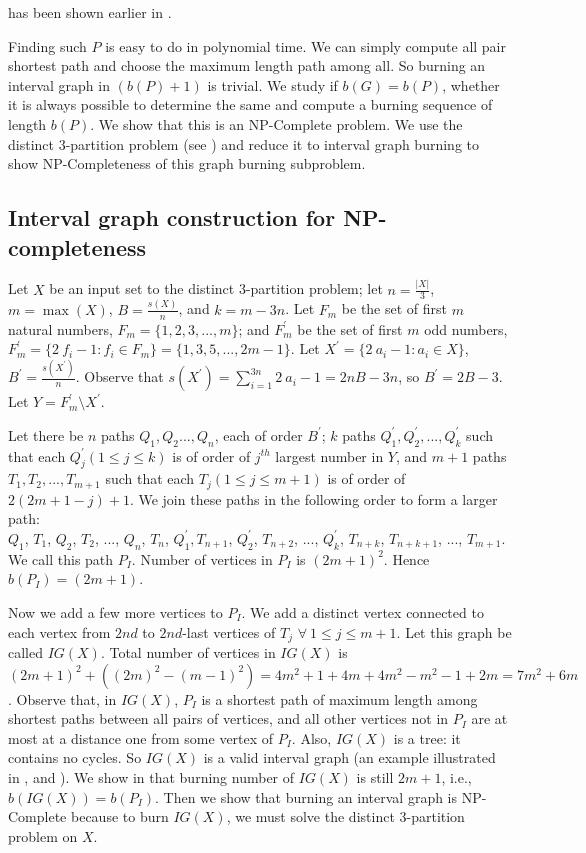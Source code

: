  has been shown earlier in \cite{Kare2019,Kamali2019,Kamali2020}.

Finding such $P$ is easy to do in polynomial time. We can simply compute all pair shortest path and choose the maximum length path among all. So burning an interval graph in $(b(P)+1)$ is trivial. We study if $b(G)=b(P)$, whether it is always possible to determine the same and compute a burning sequence of length $b(P)$. 
We show that this is an NP-Complete problem.
We use the distinct 3-partition problem (see ) and reduce it to interval graph burning to show NP-Completeness of this graph burning subproblem.

\subsection{Interval graph construction for NP-completeness}

Let $X$ be an input set to the distinct 3-partition problem; let $n=\frac{|X|}{3}$, $m = \max (X)$, $B = \frac{s(X)}{n}$, and $k=m-3n$. Let $F_m$ be the set of first $m$ natural numbers, $F_m = \{1,2,3,...,m\}$; and $F^{\prime}_m$ be the set of first $m$ odd numbers, $F^\prime_m = \{2\ f_i-1: f_i \in F_m\} = \{1, 3, 5, . . ., 2m-1\}$. Let $X^\prime = \{2\ a_i-1:a_i \in X\}$, $B^\prime = \frac{s(X^\prime)}{n}$. Observe that $s(X^\prime) = \sum_{i=1}^{3n} 2\ a_i -1 = 2nB-3n$, so $B^\prime = 2B-3$. Let $Y=F_m^\prime\setminus X^\prime$.

Let there be $n$ paths $Q_1,Q_2...,Q_n$, each of order $B^\prime$; $k$ paths $Q_1^\prime,Q_2^\prime,...,Q_k^\prime$ such that each $Q_j^\prime (1\leq j\leq k)$ is of order of $j^{th}$ largest number in $Y$, and $m+1$ paths $T_1,T_2,...,T_{m+1}$ such that each $T_j (1\leq j\leq m+1)$ is of order of $2(2m+1-j)+1$. We join these paths in the following order to form a larger path:\\
$Q_1$, $T_1$, $Q_2$, $T_2$, $...$, $Q_n$, $T_n$, $Q_1^\prime,T_{n+1}$, $Q_2^\prime$, $T_{n+2}$, $...$, $Q_k^\prime$, $T_{n+k}$, $T_{n+k+1}$, $...$, $T_{m+1}$.\\
We call this path $P_I$. Number of vertices in $P_I$ is $(2m+1)^2$. Hence $b(P_I)=(2m+1)$.

Now we add a few more vertices to $P_I$. 
We add a distinct vertex connected to each vertex from $2nd$ to $2nd$-last vertices of $T_j$ $\forall\ 1\leq j\leq m+1$.
Let this graph be called $IG(X)$. Total number of vertices in $IG(X)$ is $(2m+1)^2+((2m)^2-(m-1)^2)=4m^2+1+4m+4m^2-m^2-1+2m=7m^2+6m$. 
Observe that, in $IG(X)$, $P_I$ is a shortest path of maximum length among shortest paths between all pairs of vertices, and all other vertices not in $P_I$ are at most at a distance one from some vertex of $P_I$. Also, $IG(X)$ is a tree: it contains no cycles.
So $IG(X)$ is a valid interval graph (an example illustrated in , and ).
We show in  that burning number of $IG(X)$ is still $2m+1$, i.e., $b(IG(X))=b(P_I)$. 
Then we show that burning an interval graph is NP-Complete because to burn $IG(X)$, we must solve the distinct 3-partition problem on $X$.

